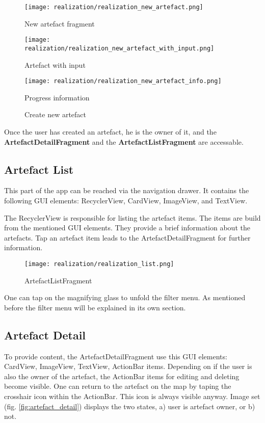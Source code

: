 \begin{figure}[htb]

  \texttt{[image: realization/realization\_new\_artefact.png]}
  \caption{New artefact	fragment}\label{fig:realization_new_artefact}
\endminipage\hfill
{}
  \texttt{[image: realization/realization\_new\_artefact\_with\_input.png]}
  \caption{Artefact with input}\label{fig:realization_new_artefact_with_input}
\endminipage\hfill
{}
  \texttt{[image: realization/realization\_new\_artefact\_info.png]}
  \caption{Progress information}\label{fig:realization_new_artefact_info}
\endminipage\hfill
\caption{Create new artefact}
\label{fig:create_artefact}
\end{figure}


Once the user has created an artefact, he is the owner of it, and the \textbf{ArtefactDetailFragment} and the \textbf{ArtefactListFragment} are accessable.

\newpage
\subsection{Artefact List}
This part of the app can be reached via the navigation drawer. It contains the following GUI elements: RecyclerView, CardView, ImageView, and TextView.

The RecyclerView is responsible for listing the artefact items. The items are build from the mentioned GUI elements. They provide a brief information about the artefacts. Tap an artefact item leads to the ArtefactDetailFragment for further information.

\begin{figure}[H]
\centering
{}
  \texttt{[image: realization/realization\_list.png]}
  \caption[ArtefactListFragment]{ArtefactListFragment}
  \label{fig:realization_list}
\endminipage\hfill
\end{figure}

One can tap on the magnifying glass to unfold the filter menu. As mentioned before the filter menu will be explained in its own section.

\subsection{Artefact Detail}
To provide content, the ArtefactDetailFragment use this GUI elements: CardView, ImageView, TextView, ActionBar items. 
Depending on if the user is also the owner of the artefact, the ActionBar items for editing and deleting become visible. One can return to the artefact on the map by taping the crosshair icon within the ActionBar. This icon is always visible anyway. Image set (fig. \ref{fig:artefact_detail}) displays the two states, a) user is artefact owner, or b) not.

